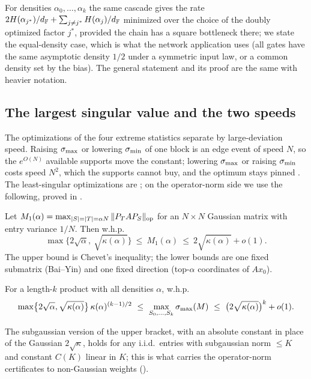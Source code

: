 \begin{remark}\label{rem:unequal}
For densities $\alpha_0,\dots,\alpha_k$ the same cascade gives the rate
$2H(\alpha_{j^*})/d_{\mathbb{F}}+\sum_{j\ne j^*}H(\alpha_j)/d_{\mathbb{F}}$ minimized over the choice of the doubly optimized
factor $j^*$, provided the chain has a square bottleneck there; we state the equal-density case, which
is what the network application uses (all gates have the same asymptotic density $1/2$ under a
symmetric input law, or a common density set by the bias). The general statement and its proof are the
same with heavier notation.
\end{remark}

\subsection{The largest singular value and the two speeds}
The optimizations of the four extreme statistics separate by large-deviation speed. Raising
$\sigma_{\max}$ or lowering $\sigma_{\min}$ of one block is an edge event of speed $N$, so the $e^{O(N)}$ available
supports move the constant; lowering $\sigma_{\max}$ or raising $\sigma_{\min}$ costs speed $N^2$, which the supports
cannot buy, and the optimum stays pinned \cite{shmaloProducts}. The least-singular optimizations are
; on the operator-norm side we use the following, proved in
.

\begin{proposition}\label{prop:A2}
Let $M_1(\alpha)=\max_{|S|=|T|=\alpha N}\|P_TAP_S\|_{\mathrm{op}}$ for an $N\times N$ Gaussian matrix with entry
variance $1/N$. Then w.h.p.
\[
  \max\bigl\{2\sqrt\alpha,\ \sqrt{\kappa(\alpha)}\bigr\}\ \le\ M_1(\alpha)\ \le\ 2\sqrt{\kappa(\alpha)}+o(1).
\]
The upper bound is Chevet's inequality; the lower bounds are one fixed submatrix (Bai--Yin) and one
fixed direction (top-$\alpha$ coordinates of $Ax_0$).
\end{proposition}

\begin{proposition}\label{prop:A4}
For a length-$k$ product with all densities $\alpha$, w.h.p.
\[
  \max\bigl\{2\sqrt\alpha,\sqrt{\kappa(\alpha)}\bigr\}\,\kappa(\alpha)^{(k-1)/2}\ \le\
  \max_{S_0,\dots,S_k}\smax(M)\ \le\ \bigl(2\sqrt{\kappa(\alpha)}\bigr)^{k}+o(1).
\]
\end{proposition}

The subgaussian version of the upper bracket, with an absolute constant in place of the Gaussian
$2\sqrt\kappa$, holds for any i.i.d.\ entries with subgaussian norm $\le K$ and constant $C(K)$
linear in $K$; this is what carries the operator-norm certificates to non-Gaussian weights
(\Cref{app:brackets}).


